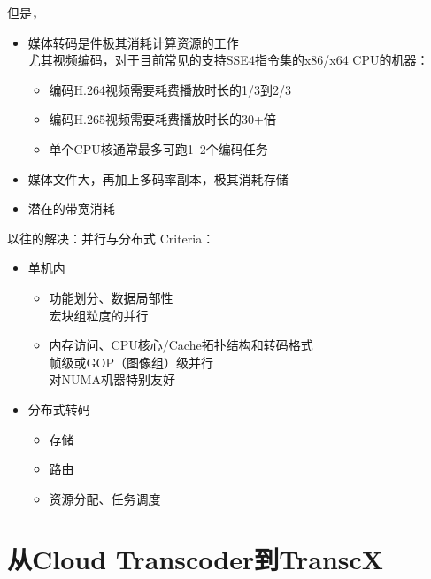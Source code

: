 \documentclass{beamer}
\begin{document}
\begin{frame}{但是，}
\pause
\begin{itemize}
\item 媒体转码是件极其消耗计算资源的工作\\ %
	尤其视频编码，对于目前常见的支持SSE4指令集的x86/x64 CPU的机器：
	\begin{itemize}
	\item  编码H.264视频需要耗费播放时长的1/3到2/3
	\item  编码H.265视频需要耗费播放时长的30+倍
	\item  单个CPU核通常最多可跑1--2个编码任务
	\end{itemize}
\item 媒体文件大，再加上多码率副本，极其消耗存储
\item 潜在的带宽消耗
\end{itemize}
\end{frame}

\begin{frame}{以往的解决：并行与分布式}
\pause
Criteria： \pause
\begin{itemize}
\item 单机内\\
	\begin{itemize}
	\item 功能划分、数据局部性\\
	宏块组粒度的并行
	\item 内存访问、CPU核心/Cache拓扑结构和转码格式\\
	帧级或GOP（图像组）级并行\\
	对NUMA机器特别友好
	\end{itemize}
\item 分布式转码
	\begin{itemize}
		\item 存储
		\item 路由
		\item 资源分配、任务调度
	\end{itemize}
\end{itemize}
\end{frame}

\section{从Cloud Transcoder到TranscX}
\end{document}
